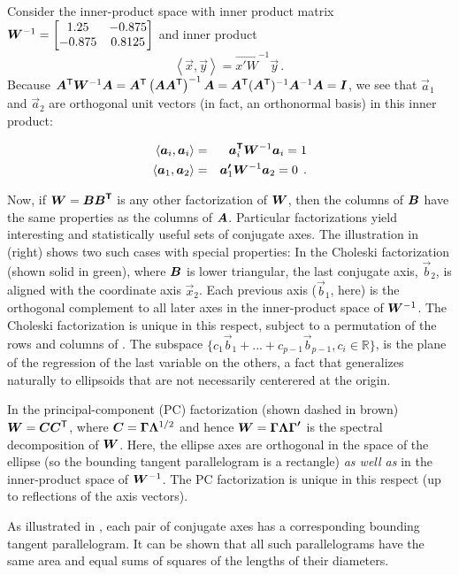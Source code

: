 Consider the inner-product space with inner product matrix 	
$\bm{W}^{-1}=\left[ \begin{matrix}	
1.25 & -0.875 \\	
-0.875 & 0.8125 \\	
\end{matrix} \right]
$ and inner product	
\begin{equation*}
\left\langle \vec{x},\vec{y} \right\rangle =\vec{{x}'W}^{-1}\vec{y} \period
\end{equation*} 	
Because	
$\bm{A}^\mathsf{T} \bm{W}^{-1}\bm{A}
=\bm{A}^\mathsf{T}\left( \bm{A}\bm{A}^\mathsf{T} \right)^{-1}\bm{A}
=\bm{A}^\mathsf{T}(\bm{A}^\mathsf{T})^{-1}\bm{A}^{-1}\bm{A}
=\bm{I}
$,
we see that
$\vec{a}_{1}$
and	
$\vec{a}_{2}$	
are orthogonal unit vectors (in fact, an orthonormal basis) in this inner product:	

\begin{eqnarray*}
\left\langle \vec{a}_{i},\vec{a}_{i} \right\rangle & = & \vec{{a}\trans}_{i}\mat{W}^{-1}\vec{a}_{i}=1	 \\
%	
\left\langle \vec{a}_{1},\vec{a}_{2} \right\rangle & = &\vec{{a}'}_{1}\mat{W}^{-1}\vec{a}_{2}=0 \period
\end{eqnarray*}


Now, if $\bm{W}=\bm{B{B}^\mathsf{T}}$ is any other factorization of
$\bm{W}$,
then the columns of
$\bm{B}$
have the same properties as the columns of
$\bm{A}$.
Particular factorizations yield interesting and statistically useful sets of conjugate axes.
The illustration in  (right) shows two such cases with special properties:
In the Choleski factorization (shown solid in green), where
$\bm{B}$ is lower triangular, the last conjugate axis, $\vec{b}_2$, is aligned with the coordinate
axis $\vec{x}_2$.  Each previous axis ($\vec{b}_1$, here) is the orthogonal complement to
all later axes in the  inner-product space of
$\bm{W}^{-1}$.  
The Choleski factorization is unique in this respect, subject to a
permutation of the rows and columns of . 
The subspace $\{ c_1 \vec{b}_1 + ... + c_{p-1} \vec{b}_{p-1}  , c_i \in \mathbb{R}\}$, is the plane of the regression of the last variable on the others, a fact that generalizes naturally to ellipsoids that are not necessarily centerered at the origin.  %

In the principal-component (PC) factorization (shown dashed in brown) $\bm{W}=\bm{C} \bm{C}^\mathsf{T}$, where
$\bm{C}=\bm{\Gamma \Lambda }^{1/2}$
and hence
$\bm{W}=\bm{\Gamma \Lambda {\Gamma }'}$
is the spectral decomposition of
$\bm{W}$. Here, the ellipse axes are orthogonal in the space of the ellipse
(so the bounding tangent parallelogram is a rectangle) \emph{as well as} in the inner-product space of
$\bm{W}^{-1}$. The PC factorization is unique in this respect (up to reflections of the axis vectors).

As illustrated in , each pair of conjugate axes has a corresponding bounding tangent
parallelogram. It can be shown that all such parallelograms have the same area
and equal sums of squares of the lengths of their diameters.
